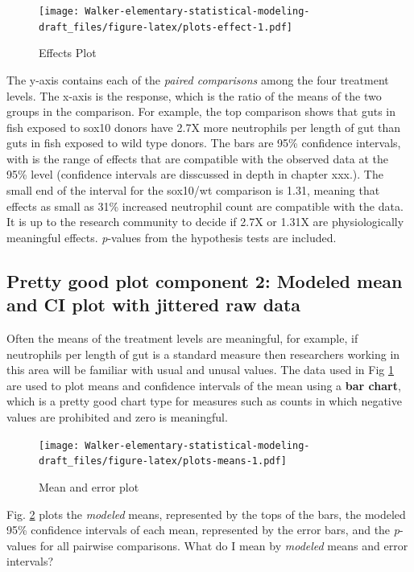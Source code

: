 \documentclass[]{book}
\begin{document}
\begin{figure}
\centering
\texttt{[image: Walker-elementary-statistical-modeling-draft\_files/figure-latex/plots-effect-1.pdf]}
\caption{\label{fig:plots-effect}Effects Plot}
\end{figure}

The y-axis contains each of the \emph{paired comparisons} among the four
treatment levels. The x-axis is the response, which is the ratio of the
means of the two groups in the comparison. For example, the top
comparison shows that guts in fish exposed to sox10 donors have 2.7X
more neutrophils per length of gut than guts in fish exposed to wild
type donors. The bars are 95\% confidence intervals, with is the range
of effects that are compatible with the observed data at the 95\% level
(confidence intervals are disscussed in depth in chapter xxx.). The
small end of the interval for the sox10/wt comparison is 1.31, meaning
that effects as small as 31\% increased neutrophil count are compatible
with the data. It is up to the research community to decide if 2.7X or
1.31X are physiologically meaningful effects. \emph{p}-values from the
hypothesis tests are included.

\subsection{Pretty good plot component 2: Modeled mean and CI plot with
jittered raw
data}\label{pretty-good-plot-component-2-modeled-mean-and-ci-plot-with-jittered-raw-data}

Often the means of the treatment levels are meaningful, for example, if
neutrophils per length of gut is a standard measure then researchers
working in this area will be familiar with usual and unusal values. The
data used in Fig \ref{fig:plots-effect} are used to plot means and
confidence intervals of the mean using a \textbf{bar chart}, which is a
pretty good chart type for measures such as counts in which negative
values are prohibited and zero is meaningful.

\begin{figure}
\centering
\texttt{[image: Walker-elementary-statistical-modeling-draft\_files/figure-latex/plots-means-1.pdf]}
\caption{\label{fig:plots-means}Mean and error plot}
\end{figure}

Fig. \ref{fig:plots-means} plots the \emph{modeled} means, represented
by the tops of the bars, the modeled 95\% confidence intervals of each
mean, represented by the error bars, and the \emph{p}-values for all
pairwise comparisons. What do I mean by \emph{modeled} means and error
intervals?
\end{document}
